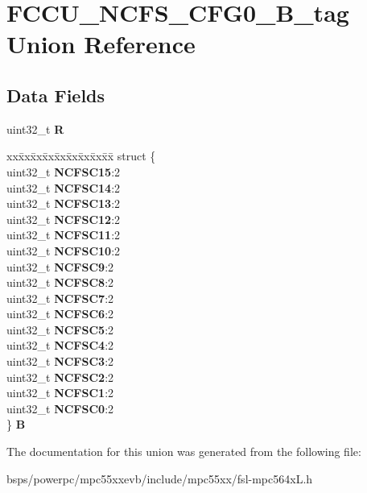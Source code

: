\hypertarget{unionFCCU__NCFS__CFG0__32B__tag}{}\section{F\+C\+C\+U\+\_\+\+N\+C\+F\+S\+\_\+\+C\+F\+G0\+\_\+B\+\_\+tag Union Reference}
\label{unionFCCU__NCFS__CFG0__32B__tag}
\subsection*{Data Fields}
\begin{DoxyCompactItemize}
\item 
\mbox{\label{unionFCCU__NCFS__CFG0__32B__tag_a707209ad2e4c665495740870c98a9af0}} 
uint32\+\_\+t {\bfseries R}
\item 
\mbox{\label{unionFCCU__NCFS__CFG0__32B__tag_aa6bffc8a64cc58b4a7c9afb2557f4cc4}} 
\begin{tabbing}
xx\=xx\=xx\=xx\=xx\=xx\=xx\=xx\=xx\=\kill
struct \{\\
\>uint32\_t {\bfseries NCFSC15}:2\\
\>uint32\_t {\bfseries NCFSC14}:2\\
\>uint32\_t {\bfseries NCFSC13}:2\\
\>uint32\_t {\bfseries NCFSC12}:2\\
\>uint32\_t {\bfseries NCFSC11}:2\\
\>uint32\_t {\bfseries NCFSC10}:2\\
\>uint32\_t {\bfseries NCFSC9}:2\\
\>uint32\_t {\bfseries NCFSC8}:2\\
\>uint32\_t {\bfseries NCFSC7}:2\\
\>uint32\_t {\bfseries NCFSC6}:2\\
\>uint32\_t {\bfseries NCFSC5}:2\\
\>uint32\_t {\bfseries NCFSC4}:2\\
\>uint32\_t {\bfseries NCFSC3}:2\\
\>uint32\_t {\bfseries NCFSC2}:2\\
\>uint32\_t {\bfseries NCFSC1}:2\\
\>uint32\_t {\bfseries NCFSC0}:2\\
\} {\bfseries B}\\

\end{tabbing}\end{DoxyCompactItemize}


The documentation for this union was generated from the following file\+:\begin{DoxyCompactItemize}
\item 
bsps/powerpc/mpc55xxevb/include/mpc55xx/fsl-\/mpc564x\+L.\+h\end{DoxyCompactItemize}
